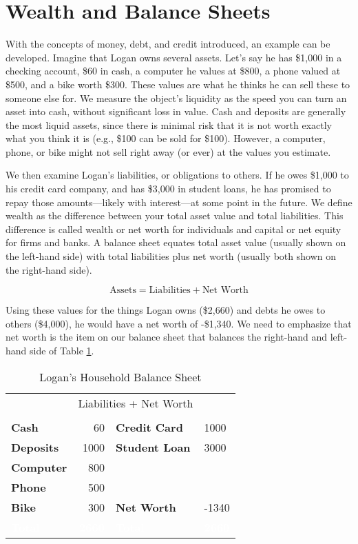\documentclass[
]{book}
\begin{document}
\hypertarget{wealth-and-balance-sheets}{%
\section{Wealth and Balance Sheets}\label{wealth-and-balance-sheets}}

With the concepts of money, debt, and credit introduced, an example can be developed. Imagine that Logan owns several assets. Let's say he has \$1,000 in a checking account, \$60 in cash, a computer he values at \$800, a phone valued at \$500, and a bike worth \$300. These values are what he thinks he can sell these to someone else for. We measure the object's liquidity as the speed you can turn an asset into cash, without significant loss in value. Cash and deposits are generally the most liquid assets, since there is minimal risk that it is not worth exactly what you think it is (e.g., \$100 can be sold for \$100). However, a computer, phone, or bike might not sell right away (or ever) at the values you estimate.

We then examine Logan's liabilities, or obligations to others. If he owes \$1,000 to his credit card company, and has \$3,000 in student loans, he has promised to repay those amounts---likely with interest---at some point in the future. We define wealth as the difference between your total asset value and total liabilities. This difference is called wealth or net worth for individuals and capital or net equity for firms and banks. A balance sheet equates total asset value (usually shown on the left-hand side) with total liabilities plus net worth (usually both shown on the right-hand side).

\[ \text{Assets}=\text{Liabilities}+\text{Net Worth}\]

Using these values for the things Logan owns (\$2,660) and debts he owes to others (\$4,000), he would have a net worth of -\$1,340. We need to emphasize that net worth is the item on our balance sheet that balances the right-hand and left-hand side of Table \ref{tab:break}.

\begin{table}

\caption{\label{tab:break}Logan’s Household Balance Sheet}
\centering
\begin{tabular}[t]{>{\bfseries}lr|>{\bfseries}ll}
\toprule
\multicolumn{2}{c}{Assets} & \multicolumn{2}{c}{Liabilities + Net Worth} \\
\cmidrule(l{3pt}r{3pt}){1-2} \cmidrule(l{3pt}r{3pt}){3-4}
 &  &  & \\
\midrule
Cash & 60 & Credit Card & 1000\\
Deposits & 1000 & Student Loan & 3000\\
Computer & 800 &  & \\
Phone & 500 &  & \\
Bike & 300 & Net Worth & -1340\\
\addlinespace
\rowcolor[HTML]{666666}  \textcolor{white}{\textbf{Total}} & \textcolor{white}{\textbf{2660}} & \textcolor{white}{\textbf{Total}} & \textcolor{white}{\textbf{2660}}\\
\bottomrule
\end{tabular}
\end{table}
\end{document}

